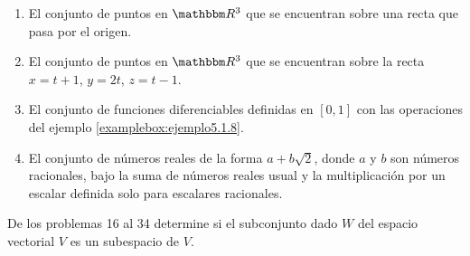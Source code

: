 \begin{enumerate}
    \item El conjunto de puntos en $\RR[3]$ que se encuentran sobre una recta que pasa por el origen.
    \item El conjunto de puntos en $\RR[3]$ que se encuentran sobre la recta $x = t+1$, $y = 2t$, $z = t-1$.
    \item El conjunto de funciones diferenciables definidas en $[0, 1]$ con las operaciones del ejemplo \ref{examplebox:ejemplo5.1.8}.
    \item El conjunto de números reales de la forma $a+b \sqrt{2}$, donde $a$ y $b$ son números racionales, bajo la suma de números reales usual y la multiplicación por un escalar definida solo para escalares racionales.
\end{enumerate}
De los problemas 16 al 34 determine si el subconjunto dado $W$ del espacio vectorial $V$ es un subespacio de $V$.
